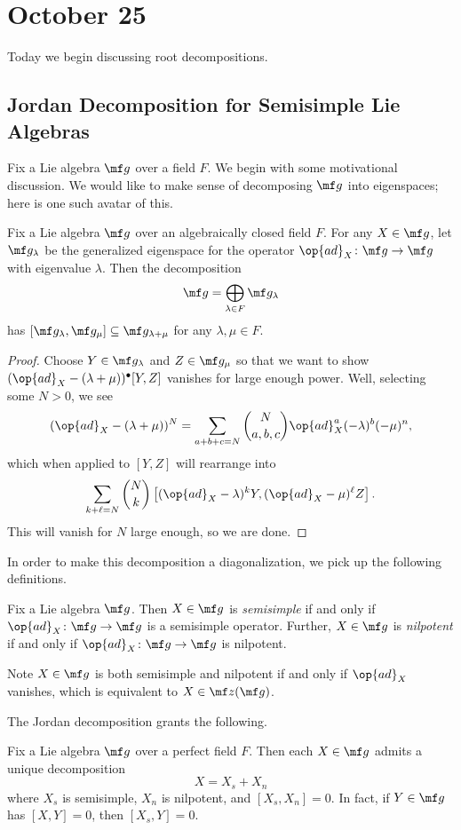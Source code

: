 \documentclass[../notes.tex]{subfiles}
\begin{document}
\section{October 25}
Today we begin discussing root decompositions.

\subsection{Jordan Decomposition for Semisimple Lie Algebras}
Fix a Lie algebra $\mf g$ over a field $F$. We begin with some motivational discussion. We would like to make sense of decomposing $\mf g$ into eigenspaces; here is one such avatar of this.
\begin{lemma} \label{lem:decompose-eigenspace-lie-alg}
	Fix a Lie algebra $\mf g$ over an algebraically closed field $F$. For any $X\in\mf g$, let $\mf g_\lambda$ be the generalized eigenspace for the operator $\op{ad}_X\colon\mf g\to\mf g$ with eigenvalue $\lambda$. Then the decomposition
	\[\mf g=\bigoplus_{\lambda\in F}\mf g_\lambda\]
	has $[\mf g_\lambda,\mf g_\mu]\subseteq\mf g_{\lambda+\mu}$ for any $\lambda,\mu\in F$.
\end{lemma}
\begin{proof}
	Choose $Y\in\mf g_\lambda$ and $Z\in\mf g_\mu$ so that we want to show $({\op{ad}_X}-(\lambda+\mu))^\bullet[Y,Z]$ vanishes for large enough power. Well, selecting some $N>0$, we see
	\[({\op{ad}_X}-(\lambda+\mu))^N=\sum_{a+b+c=N}\binom{N}{a,b,c}{\op{ad}_X^a}(-\lambda)^b(-\mu)^n,\]
	which when applied to $[Y,Z]$ will rearrange into
	\[\sum_{k+\ell=N}\binom Nk\left[({\op{ad}_X}-\lambda)^kY,({\op{ad}_X}-\mu)^\ell Z\right].\]
	This will vanish for $N$ large enough, so we are done.
\end{proof}
In order to make this decomposition a diagonalization, we pick up the following definitions.
\begin{defihelper}  
	Fix a Lie algebra $\mf g$. Then $X\in\mf g$ is \textit{semisimple} if and only if $\op{ad}_X\colon\mf g\to\mf g$ is a semisimple operator. Further, $X\in\mf g$ is \textit{nilpotent} if and only if $\op{ad}_X\colon\mf g\to\mf g$ is nilpotent.
\end{defihelper}
\begin{remark}
	Note $X\in\mf g$ is both semisimple and nilpotent if and only if $\op{ad}_X$ vanishes, which is equivalent to $X\in\mf z(\mf g)$.
\end{remark}
The Jordan decomposition grants the following.
\begin{proposition} \label{prop:ss-jordan}
	Fix a Lie algebra $\mf g$ over a perfect field $F$. Then each $X\in\mf g$ admits a unique decomposition
	\[X=X_s+X_n\]
	where $X_s$ is semisimple, $X_n$ is nilpotent, and $[X_s,X_n]=0$. In fact, if $Y\in\mf g$ has $[X,Y]=0$, then $[X_s,Y]=0$.
\end{proposition}
\end{document}

